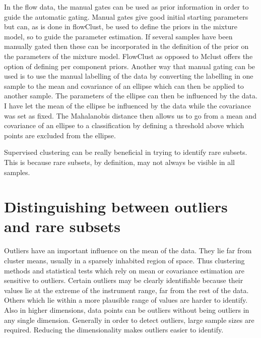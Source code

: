 In the flow data, the manual gates can be used as prior information in order to guide the automatic gating.  
Manual gates give good initial starting parameters but can, as is done in flowClust, be used to define the priors in the mixture model,
so to guide the parameter estimation.
If several samples have been manually gated then these can be incorporated in the definition of the prior on the parameters of the mixture model.
FlowClust as opposed to Mclust offers the option of defining per component priors.
Another way that manual gating can be used is to use the manual labelling of the data by converting the labelling in one sample to
the mean and covariance of an ellipse which can then be applied to another sample.
The parameters of the ellipse can then be influenced by the data.
I have let the mean of the ellipse be influenced by the data while the covariance was set as fixed.
The Mahalanobis distance then allows us to go from a mean and covariance of an ellipse to a classification by defining a threshold
above which points are excluded from the ellipse.

Supervised clustering can be really beneficial in trying to identify rare subsets.
This is because rare subsets, by definition, may not always be visible in all samples.


\section{ Distinguishing between outliers and rare subsets }

Outliers have an important influence on the mean of the data.
They lie far from cluster means, usually in a sparsely inhabited region of space.
Thus clustering methods and statistical tests which rely on mean or covariance estimation are sensitive to outliers.
Certain outliers may be clearly identifiable because their values lie at the extreme of the instrument range,
far from the rest of the data.
Others which lie within a more plausible range of values are harder to identify.
Also in higher dimensions, data points can be outliers without being outliers in any single dimension.
Generally in order to detect outliers, large sample sizes are required.
Reducing the dimensionality makes outliers easier to identify.

